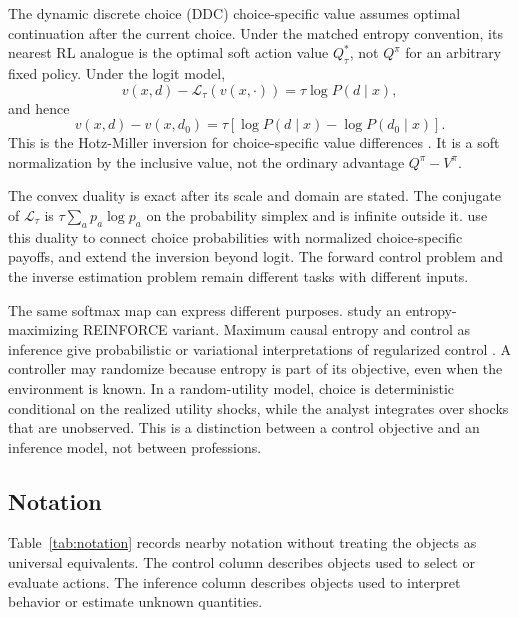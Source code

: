 The dynamic discrete choice (DDC) choice-specific value assumes optimal continuation after the current choice. Under the matched entropy convention, its nearest RL analogue is the optimal soft action value $Q^*_{\tau}$, not $Q^\pi$ for an arbitrary fixed policy. Under the logit model,
\begin{equation}
\label{eq:log_ccp_normalization}
v(x,d)-\mathcal{L}_{\tau}(v(x,\cdot))
=\tau\log P(d\mid x),
\end{equation}
and hence
\[
v(x,d)-v(x,d_0)
=\tau\left[\log P(d\mid x)-\log P(d_0\mid x)\right].
\]
This is the Hotz-Miller inversion for choice-specific value differences \citep{HotzMiller1993}. It is a soft normalization by the inclusive value, not the ordinary advantage $Q^\pi-V^\pi$.

The convex duality is exact after its scale and domain are stated. The conjugate of $\mathcal{L}_{\tau}$ is $\tau\sum_a p_a\log p_a$ on the probability simplex and is infinite outside it. \citet{ChiongGalichonShum2016} use this duality to connect choice probabilities with normalized choice-specific payoffs, and \citet{FosgerauSorensen2022} extend the inversion beyond logit. The forward control problem and the inverse estimation problem remain different tasks with different inputs.

The same softmax map can express different purposes. \citet{WilliamsPeng1991} study an entropy-maximizing REINFORCE variant. Maximum causal entropy and control as inference give probabilistic or variational interpretations of regularized control \citep{Ziebart2010,Levine2018}. A controller may randomize because entropy is part of its objective, even when the environment is known. In a random-utility model, choice is deterministic conditional on the realized utility shocks, while the analyst integrates over shocks that are unobserved. This is a distinction between a control objective and an inference model, not between professions.

\subsection{Notation}
\label{subsec:notation}

Table~\ref{tab:notation} records nearby notation without treating the objects as universal equivalents. The control column describes objects used to select or evaluate actions. The inference column describes objects used to interpret behavior or estimate unknown quantities.

